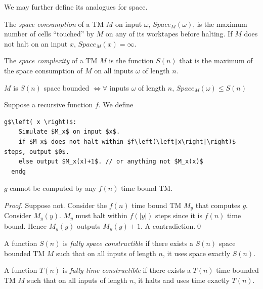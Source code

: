 We may further define its analogues for space.
\begin{definition}
  The \textit{space consumption} of a TM $M$ on input $\omega$, $Space_M\left(
  \omega \right) $, is the maximum number of cells ``touched'' by $M$ on any of
  its worktapes before halting. If $M$ does not halt on an input $x$,
  $Space_M\left( x \right) =\infty$.
\end{definition}

\begin{definition}
  The \textit{space complexity} of a TM $M$ is the function $S(n)$ that is
  the maximum of the space consumption of $M$ on all inputs $\omega$
  of length $n$.
  \begin{center}
    $M$ is $S(n)$ space bounded $\iff\forall$ inputs $\omega$ of length $n$,
    $Space_M\left( \omega \right) \le S(n)$
  \end{center}
\end{definition}

\begin{prop}
  Suppose a recursive function $f$. We define
  \begin{lstlisting}[mathescape]
  g$\left( x \right)$:
    Simulate $M_x$ on input $x$.
    if $M_x$ does not halt within $f\left(\left|x\right|\right)$ steps, output $0$.
    else output $M_x(x)+1$. // or anything not $M_x(x)$
  endg
  \end{lstlisting}
  $g$ cannot be computed by any $f(n)$ time bound TM.
\end{prop}
\begin{proof}
  Suppose not. Consider the $f(n) $ time bound TM $M_y$ that computes $g$.
  Consider $M_y\left( y \right)$. $M_y$ must halt within $f(\left| y \right|)$
  steps since it is $f(n)$ time bound. Hence $M_y\left( y \right) $ outputs
  $M_y(y)+1$. A contradiction.\qed
\end{proof}

\begin{definition}
  A function $S(n)$ is \textit{fully space constructible} if there exists a
  $S(n)$ space bounded TM $M$ such that on all inputs of length $n$, it uses
  space exactly $S(n)$.
\end{definition}

\begin{definition}
  A function $T(n)$ is \textit{fully time constructible} if there exists a
  $T(n)$ time bounded TM $M$ such that on all inputs of length $n$, it halts
  and uses time exactly $T(n)$.
\end{definition}

